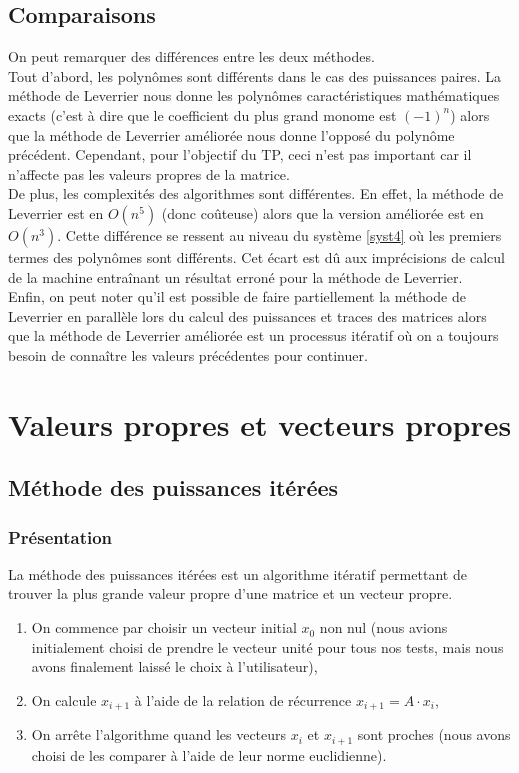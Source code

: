 \documentclass{report}
\begin{document}
    \section{Comparaisons}
    On peut remarquer des différences entre les deux méthodes. \\
    
    Tout d'abord, les polynômes sont différents dans le cas des puissances paires. La méthode de Leverrier nous donne les polynômes caractéristiques mathématiques exacts (c'est à dire que le coefficient du plus grand monome est $(-1)^{n}$) alors que la méthode de Leverrier améliorée nous donne l'opposé du polynôme précédent. Cependant, pour l'objectif du TP, ceci n'est pas important car il n'affecte pas les valeurs propres de la matrice. \\
    
    De plus, les complexités des algorithmes sont différentes. En effet, la méthode de Leverrier est en $O(n^5)$ (donc coûteuse) alors que la version améliorée est en $O(n^3)$. Cette différence se ressent au niveau du système \eqref{syst4} où les premiers termes des polynômes sont différents. Cet écart est dû aux imprécisions de calcul de la machine entraînant un résultat erroné pour la méthode de Leverrier. \\
    
    Enfin, on peut noter qu'il est possible de faire partiellement la méthode de Leverrier en parallèle lors du calcul des puissances et traces des matrices alors que la méthode de Leverrier améliorée est un processus itératif où on a toujours besoin de connaître les valeurs précédentes pour continuer.
    
    \chapter{Valeurs propres et vecteurs propres}
    \section{Méthode des puissances itérées}
      \subsection{Présentation}
      La méthode des puissances itérées est un algorithme itératif permettant de trouver la plus grande valeur propre d'une matrice et un vecteur propre. \\
      
      \begin{enumerate}
      \item{On commence par choisir un vecteur initial $x_{0}$ non nul (nous avions initialement choisi de prendre le vecteur unité pour tous nos tests, mais nous avons finalement laissé le choix à l'utilisateur),}
      \item{On calcule $x_{i+1}$ à l'aide de la relation de récurrence $x_{i+1} = A \cdot x_i$,} 
      \item{On arrête l'algorithme quand les vecteurs $x_i$ et $x_{i+1}$ sont proches (nous avons choisi de les comparer à l'aide de leur norme euclidienne).}
      \end{enumerate}
      
\end{document}
